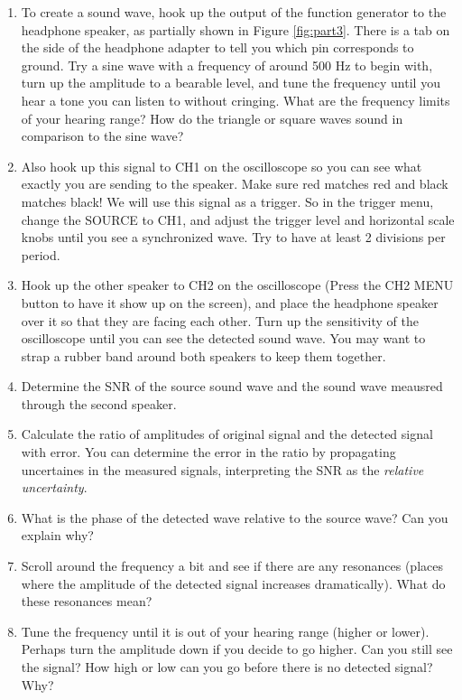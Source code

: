 \begin{enumerate}
\item To create a sound wave, hook up the output of the function generator to the headphone speaker, as partially shown in Figure \ref{fig:part3}. There is a tab on the side of the headphone adapter to tell you which pin corresponds to ground. Try a sine wave with a frequency of around 500 Hz to begin with, turn up the amplitude to a bearable level, and tune the frequency until you hear a tone you can listen to without cringing. What are the frequency limits of your hearing range? How do the triangle or square waves sound in comparison to the sine wave?

\item Also hook up this signal to CH1 on the oscilloscope so you can see what exactly you are sending to the speaker. Make sure red matches red and black matches black! We will use this signal as a trigger. So in the trigger menu, change the SOURCE to CH1, and adjust the trigger level and horizontal scale knobs until you see a synchronized wave. Try to have at least 2 divisions per period.

\item Hook up the other speaker to CH2 on the oscilloscope (Press the CH2 MENU button to have it show up on the screen), and place the headphone speaker over it so that they are facing each other. Turn up the sensitivity of the oscilloscope until you can see the detected sound wave.  You may want to strap a rubber band around both speakers to keep them together.

\item Determine the SNR of the source sound wave and the sound wave meausred through the second speaker. 

\item Calculate the ratio of amplitudes of original signal and the detected signal with error. You can determine the error in the ratio by propagating uncertaines in the measured signals, interpreting the SNR as the {\it{relative uncertainty}}.

\item What is the phase of the detected wave relative to the source wave? Can you explain why?

\item Scroll around the frequency a bit and see if there are any resonances (places where the amplitude of the detected signal increases dramatically). What do these resonances mean?

\item Tune the frequency until it is out of your hearing range (higher or lower). Perhaps turn the amplitude down if you decide to go higher. Can you still see the signal? How high or low can you go before there is no detected signal? Why?

\end{enumerate}





